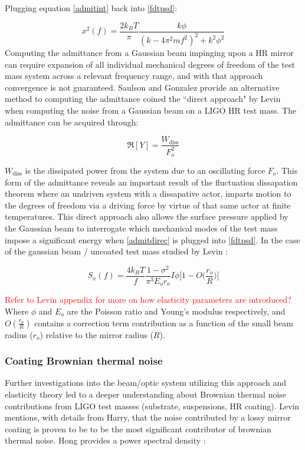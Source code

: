 \noindent Plugging equation \ref{admitint} back into \ref{fdtpsd}:

\begin{equation}
x^2 (f)  = \frac{2k_B T}{\pi}\frac{k\phi}{(k-4\pi^2 m f^2)^2 + k^2 \phi^2}
\end{equation}
Computing the admittance from a Gaussian beam impinging upon a HR mirror can require expansion of all individual mechanical degrees of freedom of the test mass system across a relevant frequency range, and with that approach convergence is not guaranteed. Saulson and Gonzalez provide an alternative method to computing the admittance coined the ``direct approach" by Levin when computing the noise from a Gaussian beam on a LIGO HR test mass. The admittance can be acquired through:

\begin{equation}\label{admitdirec}
\Re[Y] = \frac{W_\mathrm{diss}}{F_o^2}
\end{equation}

\noindent $W_\mathrm{diss}$ is the dissipated power from the system due to an oscillating force $F_o$. This form of the admittance reveals an important result of the fluctuation dissapation theorem where an undriven system with a dissapative actor, imparts motion to the degrees of freedom via a driving force by virtue of that same actor at finite temperatures. This direct approach also allows the surface pressure applied by the Gaussian beam to interrogate which mechanical modes of the test mass impose a significant energy when \ref{admitdirec} is plugged into \ref{fdtpsd}. In the case of the gaussian beam / uncoated test mass studied by Levin \cite{levin:1998}:

\begin{equation}
S_x(f) = \frac{4 k_B T}{f} \frac{1-\sigma^2}{\pi^3 E_o r_o} I\phi \bigg[1- O\bigg( \frac{r_o}{R} \bigg)\bigg]
\end{equation}


\textcolor{red}{Refer to Levin appendix for more on how elasticity parameters are introduced?} Where $\phi$ and $E_o$ are the Poisson ratio and Young's modulus respectively, and $O(\frac{r_o}{R})$ contains a correction term contribution as a function of the small beam radius ($r_o$) relative to the mirror radius ($R$).

\subsubsection{Coating Brownian thermal noise}
Further investigations into the beam/optic system utilizing this approach and elasticity theory led to a deeper understanding about Brownian thermal noise contributions from LIGO test masses (substrate, suspensions, HR coating). Levin mentions, with details from Harry, that the noise contributed by a lossy mirror coating is proven to be to be the most significant contributor of brownian thermal noise. Hong provides a power spectral density \cite{Hong:2013}:

